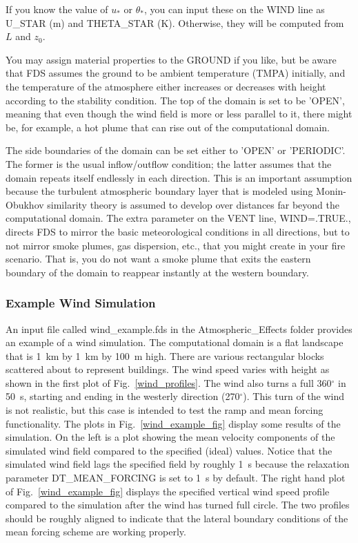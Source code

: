 \documentclass[11pt]{book}
\begin{document}
If you know the value of $u_*$ or $\theta_*$, you can input these on the {\ct WIND} line as {\ct U\_STAR} (m) and {\ct THETA\_STAR} (K). Otherwise, they will be computed from $L$ and $z_0$.

You may assign material properties to the {\ct GROUND} if you like, but be aware that FDS assumes the ground to be ambient temperature ({\ct TMPA}) initially, and the temperature of the atmosphere either increases or decreases with height according to the stability condition. The top of the domain is set to be {\ct 'OPEN'}, meaning that even though the wind field is more or less parallel to it, there might be, for example, a hot plume that can rise out of the computational domain.

The side boundaries of the domain can be set either to {\ct 'OPEN'} or {\ct 'PERIODIC'}. The former is the usual inflow/outflow condition; the latter assumes that the domain repeats itself endlessly in each direction. This is an important assumption because the turbulent atmospheric boundary layer that is modeled using Monin-Obukhov similarity theory is assumed to develop over distances far beyond the computational domain. The extra parameter on the {\ct VENT} line, {\ct WIND=.TRUE.}, directs FDS to mirror the basic meteorological conditions in all directions, but to not mirror smoke plumes, gas dispersion, etc., that you might create in your fire scenario. That is, you do not want a smoke plume that exits the eastern boundary of the domain to reappear instantly at the western boundary.

\subsubsection{Example Wind Simulation}
\label{wind_example}

An input file called {\ct wind\_example.fds} in the {\ct Atmospheric\_Effects} folder provides an example of a wind simulation. The computational domain is a flat landscape that is 1~km by 1~km by 100~m high. There are various rectangular blocks scattered about to represent buildings. The wind speed varies with height as shown in the first plot of Fig.~\ref{wind_profiles}. The wind also turns a full 360$^\circ$ in 50~s, starting and ending in the westerly direction (270$^\circ$). This turn of the wind is not realistic, but this case is intended to test the ramp and mean forcing functionality. The plots in Fig.~\ref{wind_example_fig} display some results of the simulation. On the left is a plot showing the mean velocity components of the simulated wind field compared to the specified (ideal) values. Notice that the simulated wind field lags the specified field by roughly 1~s because the relaxation parameter {\ct DT\_MEAN\_FORCING} is set to 1~s by default. The right hand plot of Fig.~\ref{wind_example_fig} displays the specified vertical wind speed profile compared to the simulation after the wind has turned full circle. The two profiles should be roughly aligned to indicate that the lateral boundary conditions of the mean forcing scheme are working properly.
\end{document}
